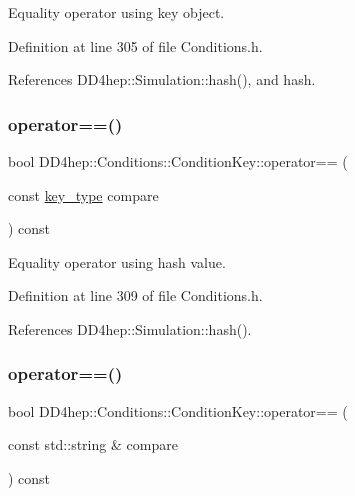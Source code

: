 Equality operator using key object. 



Definition at line 305 of file Conditions.\+h.



References D\+D4hep\+::\+Simulation\+::hash(), and hash.

\hypertarget{class_d_d4hep_1_1_conditions_1_1_condition_key_ab2a131ace8a307026b381ea2c9e9931a}{}\label{class_d_d4hep_1_1_conditions_1_1_condition_key_ab2a131ace8a307026b381ea2c9e9931a} 
\subsubsection{\texorpdfstring{operator==()}{operator==()}\hspace{0.1cm}{\footnotesize\ttfamily [2/3]}}
{\footnotesize\ttfamily bool D\+D4hep\+::\+Conditions\+::\+Condition\+Key\+::operator== (\begin{DoxyParamCaption}\item[{const \hyperlink{class_d_d4hep_1_1_conditions_1_1_condition_key_a08bfc8ccb807bdd5e4d9f3b065d1c8f5}{key\+\_\+type}}]{compare }\end{DoxyParamCaption}) const\hspace{0.3cm}{\ttfamily [inline]}}



Equality operator using hash value. 



Definition at line 309 of file Conditions.\+h.



References D\+D4hep\+::\+Simulation\+::hash().

\hypertarget{class_d_d4hep_1_1_conditions_1_1_condition_key_afdad64fd8d109fdaf668a5bb0b1daba9}{}\label{class_d_d4hep_1_1_conditions_1_1_condition_key_afdad64fd8d109fdaf668a5bb0b1daba9} 
\subsubsection{\texorpdfstring{operator==()}{operator==()}\hspace{0.1cm}{\footnotesize\ttfamily [3/3]}}
{\footnotesize\ttfamily bool D\+D4hep\+::\+Conditions\+::\+Condition\+Key\+::operator== (\begin{DoxyParamCaption}\item[{const std\+::string \&}]{compare }\end{DoxyParamCaption}) const}



